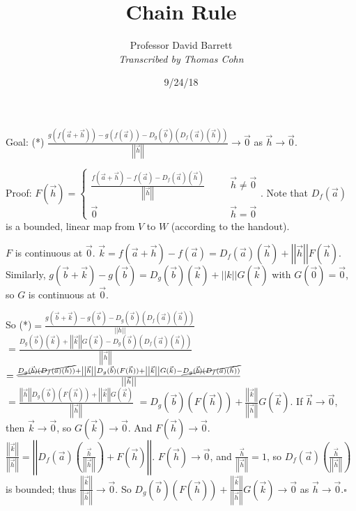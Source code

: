 \documentclass[10pt,letterpaper]{article}
\author{Professor David Barrett\\ \small\textit{Transcribed by Thomas Cohn}}
\title{Chain Rule}
\date{9/24/18} %
\newcommand{\n}{\hfill\break}
\newcommand{\proven}{\;$\square$\n}
\newcommand{\abs}[1]{\left|#1\right|}
\newcommand{\norm}[1]{\abs{\abs{#1}}}
\begin{document}
\maketitle
\setlength\RaggedRightParindent{\parindent}
\RaggedRight

\par\noindent Goal: (*) $\frac{g(f(\vec{a}+\vec{h}))-g(f(\vec{a}))-D_{g}(\vec{b})(D_{f}(\vec{a})(\vec{h}))}{\norm{\vec{h}}}\to\vec{0}$ as $\vec{h}\to\vec{0}$.\n

\par\noindent Proof: $F(\vec{h})=\left\{\begin{array}{lll}\frac{f(\vec{a}+\vec{h})-f(\vec{a})-D_{f}(\vec{a})(\vec{h})}{\norm{\vec{h}}} & \quad & \vec{h}\ne\vec{0}\\ \vec{0} & \quad & \vec{h}=\vec{0}\end{array}\right.$.\n
Note that $D_{f}(\vec{a})$ is a bounded, linear map from $V$ to $W$ (according to the handout).\n

\par\noindent $F$ is continuous at $\vec{0}$.\n
$\vec{k}=f(\vec{a}+\vec{h})-f(\vec{a})=D_{f}(\vec{a})(\vec{h})+\norm{\vec{h}}F(\vec{h})$.\n
Similarly, $g(\vec{b}+\vec{k})-g(\vec{b})=D_{g}(\vec{b})(\vec{k})+\norm{k}G(\vec{k})$ with $G(\vec{0})=\vec{0}$, so $G$ is continuous at $\vec{0}$.\n

\par\noindent So (*)$=\frac{g(\vec{b}+\vec{k})-g(\vec{b})-D_{g}(\vec{b})(D_{f}(\vec{a})(\vec{h}))}{\norm{h}}$\n
\phantom{So (*)}$=\frac{D_{g}(\vec{b})(\vec{k})+\norm{\vec{k}}G(\vec{k})-D_{g}(\vec{b})(D_{f}(\vec{a})(\vec{h}))}{\norm{\vec{h}}}$\n
\phantom{So (*)}$=\frac{\cancel{D_{g}(\vec{b})(D_{f}(\vec{a})(\vec{h}))}+\norm{\vec{h}}D_{g}(\vec{b})(F(\vec{h}))+\norm{\vec{k}}G(\vec{k})-\cancel{D_{g}(\vec{b})(D_{f}(\vec{a})(\vec{h}))}}{\norm{\vec{h}}}$\n
\phantom{So (*)}$=\frac{\norm{\vec{h}}D_{g}(\vec{b})(F(\vec{h}))+\norm{\vec{k}}G(\vec{k})}{\norm{\vec{h}}}$\n
\phantom{So (*)}$=D_{g}(\vec{b})(F(\vec{h}))+\frac{\norm{\vec{k}}}{\norm{\vec{h}}}G(\vec{k})$.\n
If $\vec{h}\to{}\vec{0}$, then $\vec{k}\to\vec{0}$, so $G(\vec{k})\to\vec{0}$. And $F(\vec{h})\to\vec{0}$.\n
$\frac{\norm{\vec{k}}}{\norm{\vec{h}}}=\norm{D_{f}(\vec{a})\left(\frac{\vec{h}}{\norm{\vec{h}}}\right)+F(\vec{h})}$. $F(\vec{h})\to\vec{0}$, and $\frac{\vec{h}}{\norm{\vec{h}}}=1$, so $D_{f}(\vec{a})\left(\frac{\vec{h}}{\norm{\vec{h}}}\right)$ is bounded; thus $\frac{\norm{\vec{k}}}{\norm{\vec{h}}}\to\vec{0}$.\n
So $D_{g}(\vec{b})(F(\vec{h}))+\frac{\norm{\vec{k}}}{\norm{\vec{h}}}G(\vec{k})\to\vec{0}$ as $\vec{h}\to\vec{0}$.\proven
\end{document}
